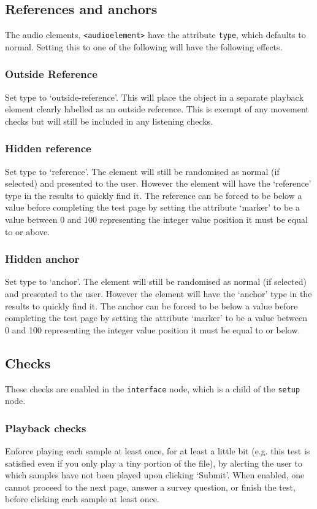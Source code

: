\documentclass[11pt, oneside]{article}   	%
\begin{document}
	\subsection{References and anchors}
	\label{sec:referencesandanchors}
	    The audio elements, \texttt{<audioelement>} have the attribute \texttt{type}, which defaults to normal. Setting this to one of the following will have the following effects.
		\subsubsection{Outside Reference}
		    Set type to `outside-reference'. This will place the object in a separate playback element clearly labelled as an outside reference. This is exempt of any movement checks but will still be included in any listening checks.
		\subsubsection{Hidden reference} 
		    Set type to `reference'. The element will still be randomised as normal (if selected) and presented to the user. However the element will have the `reference' type in the results to quickly find it. The reference can be forced to be below a value before completing the test page by setting the attribute `marker' to be a value between 0 and 100 representing the integer value position it must be equal to or above.
		\subsubsection{Hidden anchor}
		    Set type to `anchor'. The element will still be randomised as normal (if selected) and presented to the user. However the element will have the `anchor' type in the results to quickly find it. The anchor can be forced to be below a value before completing the test page by setting the attribute `marker' to be a value between 0 and 100 representing the integer value position it must be equal to or below.

	\subsection{Checks}
		\label{sec:checks}

		These checks are enabled in the \texttt{interface} node, which is a child of the \texttt{setup} node. 
		\subsubsection{Playback checks}
				Enforce playing each sample at least once, for at least a little bit (e.g. this test is satisfied even if you only play a tiny portion of the file), by alerting the user to which samples have not been played upon clicking `Submit'. When enabled, one cannot proceed to the next page, answer a survey question, or finish the test, before clicking each sample at least once. 
\end{document}
